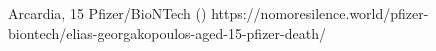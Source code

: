           {Arcardia, }
          {15}
          {Pfizer/BioNTech}
          {}
          {
             ()
          }
          {https://nomoresilence.world/pfizer-biontech/elias-georgakopoulos-aged-15-pfizer-death/}


